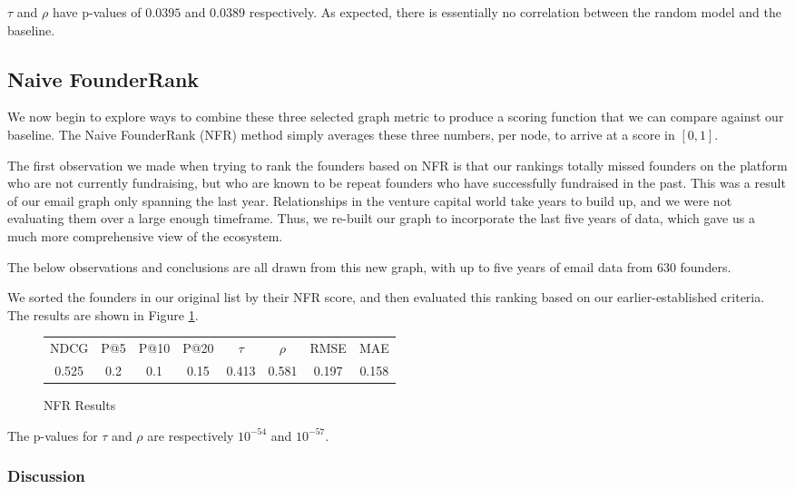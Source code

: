 $\tau$ and $\rho$ have p-values of $0.0395$ and $0.0389$ respectively. As expected, there is essentially no correlation between the random model and the baseline.

\subsection{Naive FounderRank}
\label{ch5:nfr}

We now begin to explore ways to combine these three selected graph metric to produce a scoring function that we can compare against our baseline. The Naive FounderRank (NFR) method simply averages these three numbers, per node, to arrive at a score in $[0, 1]$.

The first observation we made when trying to rank the founders based on NFR is that our rankings totally missed founders on the platform who are not currently fundraising, but who are known to be repeat founders who have successfully fundraised in the past. This was a result of our email graph only spanning the last year. Relationships in the venture capital world take years to build up, and we were not evaluating them over a large enough timeframe. Thus, we re-built our graph to incorporate the last five years of data, which gave us a much more comprehensive view of the ecosystem.

The below observations and conclusions are all drawn from this new graph, with up to five years of email data from $630$ founders.

We sorted the founders in our original list by their NFR score, and then evaluated this ranking based on our earlier-established criteria. The results are shown in Figure \ref{fig:nfr:results}.

\begin{figure}[ht]
\begin{tabular}{c | c | c | c | c | c | c | c}
NDCG & P@5 & P@10 & P@20 & $\tau$ & $\rho$ & RMSE & MAE  \\
0.525 & 0.2 & 0.1 & 0.15 & 0.413 & 0.581 & 0.197 & 0.158 \\
\end{tabular}
\centering
\caption{NFR Results}
\label{fig:nfr:results}
\end{figure}

The p-values for $\tau$ and $\rho$ are respectively $10^{-54}$ and $10^{-57}$.

\subsubsection{Discussion}

